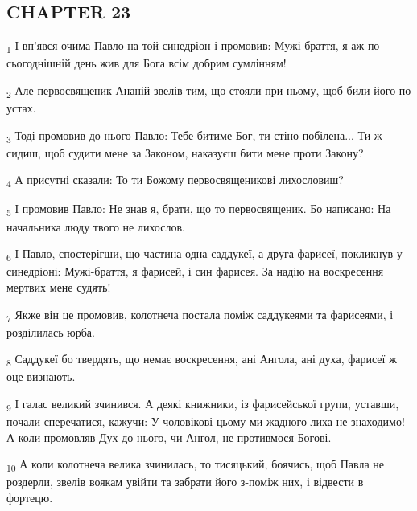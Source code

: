 \subsection{CHAPTER 23}
\begin{tcolorbox}
\textsubscript{1} І вп'явся очима Павло на той синедріон і промовив: Мужі-браття, я аж по сьогоднішній день жив для Бога всім добрим сумлінням!
\end{tcolorbox}
\begin{tcolorbox}
\textsubscript{2} Але первосвященик Ананій звелів тим, що стояли при ньому, щоб били його по устах.
\end{tcolorbox}
\begin{tcolorbox}
\textsubscript{3} Тоді промовив до нього Павло: Тебе битиме Бог, ти стіно побілена... Ти ж сидиш, щоб судити мене за Законом, наказуєш бити мене проти Закону?
\end{tcolorbox}
\begin{tcolorbox}
\textsubscript{4} А присутні сказали: То ти Божому первосвященикові лихословиш?
\end{tcolorbox}
\begin{tcolorbox}
\textsubscript{5} І промовив Павло: Не знав я, брати, що то первосвященик. Бо написано: На начальника люду твого не лихослов.
\end{tcolorbox}
\begin{tcolorbox}
\textsubscript{6} І Павло, спостерігши, що частина одна саддукеї, а друга фарисеї, покликнув у синедріоні: Мужі-браття, я фарисей, і син фарисея. За надію на воскресення мертвих мене судять!
\end{tcolorbox}
\begin{tcolorbox}
\textsubscript{7} Якже він це промовив, колотнеча постала поміж саддукеями та фарисеями, і розділилась юрба.
\end{tcolorbox}
\begin{tcolorbox}
\textsubscript{8} Саддукеї бо твердять, що немає воскресення, ані Ангола, ані духа, фарисеї ж оце визнають.
\end{tcolorbox}
\begin{tcolorbox}
\textsubscript{9} І галас великий зчинився. А деякі книжники, із фарисейської групи, уставши, почали сперечатися, кажучи: У чоловікові цьому ми жадного лиха не знаходимо! А коли промовляв Дух до нього, чи Ангол, не противмося Богові.
\end{tcolorbox}
\begin{tcolorbox}
\textsubscript{10} А коли колотнеча велика зчинилась, то тисяцький, боячись, щоб Павла не роздерли, звелів воякам увійти та забрати його з-поміж них, і відвести в фортецю.
\end{tcolorbox}

